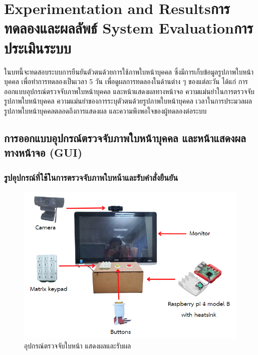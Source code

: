 \chapter{\ifproject%
\ifenglish Experimentation and Results\else การทดลองและผลลัพธ์\fi
\else%
\ifenglish System Evaluation\else การประเมินระบบ\fi
\fi}

ในบทนี้จะทดสอบระบบการยืนยันตัวตนด้วยการใช้ภาพใบหน้าบุคคล ซึ่งมีการเก็บข้อมูลรูปภาพใบหน้าบุคคล เพื่อทำการทดลองเป็นเวลา 5 วัน เพื่อดูผลการทดลองในด้านต่าง ๆ ของแต่ละวัน ได้แก่ 
การออกแบบอุปกรณ์ตรวจจับภาพใบหน้าบุคคล และหน้าแสดงผลทางหน้าจอ ความแม่นยำในการตรวจจับรูปภาพใบหน้าบุคคล ความแม่นยำของการระบุตัวตนด้วยรูปภาพใบหน้าบุคคล 
เวลาในการประมวลผลรูปภาพใบหน้าบุคคลตลอดถึงการแสดงผล 
และความพึงพอใจของผู้ทดลองต่อระบบ

\section{การออกแบบอุปกรณ์ตรวจจับภาพใบหน้าบุคคล และหน้าแสดงผลทางหน้าจอ (GUI)}

\subsection{รูปอุปกรณ์ที่ใช้ในการตรวจจับภาพใบหน้าและรับคำสั่งยืนยัน}

\begin{figure}[!ht]
  \begin{center}
    \includegraphics[scale=.6]{pic/overall_module.png}
    \caption[อุปกรณ์ตรวจจับใบหน้า แสดงผลและรับผล]{อุปกรณ์ตรวจจับใบหน้า แสดงผลและรับผล}
    \label{fig:module_pi}
  \end{center}
\end{figure}


